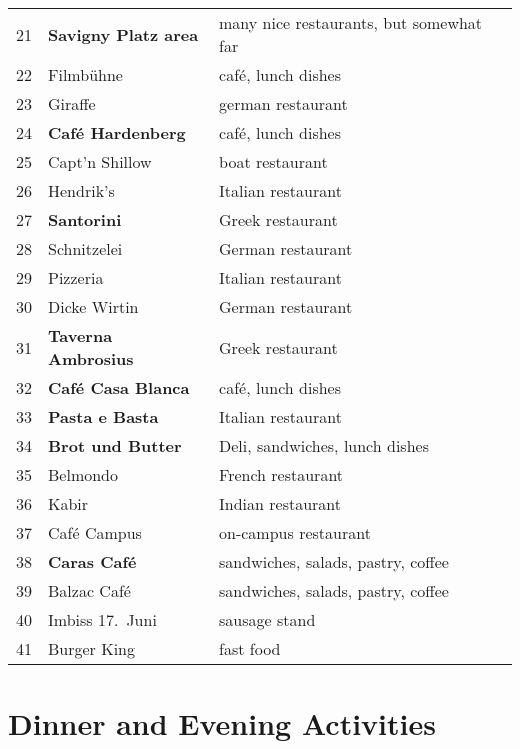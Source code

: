 \begin{multicols}{2}[]
    \begin{tabular}{rll}
        21 & \bf Savigny Platz area& many nice restaurants, but somewhat far\\
        22 & Filmb\"uhne & caf\'e, lunch dishes \\
        23 & Giraffe & german restaurant \\
        24 & \bf Caf\'e Hardenberg& caf\'e, lunch dishes\\ 
        25 & Capt'n Shillow & boat restaurant\\
        26 & Hendrik's & Italian restaurant \\ 
        27 & \bf Santorini & Greek restaurant \\ 
        28 & Schnitzelei & German restaurant \\ 
        29 & Pizzeria & Italian restaurant \\
        30 & Dicke Wirtin & German restaurant \\
        31 & \bf Taverna Ambrosius & Greek restaurant \\
        32 & \bf Caf\'e Casa Blanca & caf\'e, lunch dishes\\
        33 & \bf Pasta e Basta & Italian restaurant\\
        34 & \bf Brot und Butter & Deli, sandwiches, lunch dishes\\
        35 & Belmondo & French restaurant \\
        36 & Kabir & Indian restaurant \\
        37 & Caf\'e Campus & on-campus restaurant\\
        38 & \bf Caras Caf\'e & sandwiches, salads, pastry, coffee   \\ 
        39 & Balzac Caf\'e & sandwiches, salads, pastry, coffee   \\ 
        40 & Imbiss 17.~Juni & sausage stand\\
        41 & Burger King & fast food \\
    \end{tabular}

\end{multicols}
\endgroup
\normalsize %



 \section{Dinner and Evening Activities}



\setlength\fboxrule{0pt}
